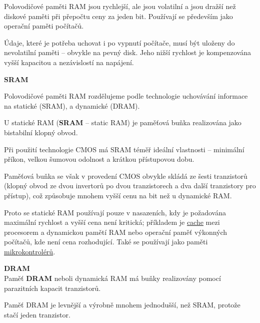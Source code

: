 \documentclass[12pt]{article}
\begin{document}
Polovodičové paměti RAM jsou rychlejší, ale jsou volatilní a jsou dražší než diskové paměti při přepočtu ceny za jeden bit. Používají se především jako operační paměti počítačů.

Údaje, které je potřeba uchovat i po vypnutí počítače, musí být uloženy do nevolatilní paměti -- obvykle na pevný disk. Jeho nižší rychlost je kompenzována vyšší kapacitou a nezávislostí na napájení.

\vspace{0.5\baselineskip} %
\textbf{SRAM}

Polovodičové paměti RAM rozdělujeme podle technologie uchovávání informace na statické (SRAM),  a dynamické (DRAM).

U statické RAM (\textbf{SRAM} -- static RAM) je paměťová buňka realizována jako bistabilní klopný obvod. 

Při použití technologie CMOS má SRAM téměř ideální vlastnosti -- minimální příkon, velkou šumovou odolnost a krátkou přístupovou dobu. 

Paměťová buňka se však v provedení CMOS obvykle skládá ze šesti tranzistorů (klopný obvod ze dvou invertorů po dvou tranzistorech a dva další tranzistory pro přístup), což způsobuje mnohem vyšší cenu na bit než u dynamické RAM. 

Proto se statické RAM používají pouze v nasazeních, kdy je požadována maximální rychlost a vyšší cena není kritická; příkladem je \href{https://cs.wikipedia.org/wiki/Cache}{cache} mezi procesorem a dynamickou pamětí RAM nebo operační paměť výkonných počítačů, kde není cena rozhodující.
Také se používají jako paměti \hyperlink{mc}{mikrokontrolérů}. 

\vspace{0.5\baselineskip} %
\textbf{DRAM} \\  %
Paměť \textbf{DRAM} neboli dynamická RAM má buňky realizovány pomocí parazitních kapacit tranzistorů. 

Paměť DRAM je levnější a výrobně mnohem jednodušší, než SRAM, protože stačí jeden tranzistor. 
\end{document}
